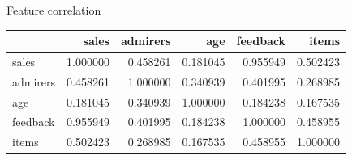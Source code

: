 \begin{frame}[fragile]{Feature correlation}
    \begin{center}
        \begin{tabular}{lrrrrr}
        \toprule
        {} &     sales &  admirers &       age &  feedback &     items \\
        \midrule
        sales    &  1.000000 &  0.458261 &  0.181045 &  0.955949 &  0.502423 \\
        admirers &  0.458261 &  1.000000 &  0.340939 &  0.401995 &  0.268985 \\
        age      &  0.181045 &  0.340939 &  1.000000 &  0.184238 &  0.167535 \\
        feedback &  0.955949 &  0.401995 &  0.184238 &  1.000000 &  0.458955 \\
        items    &  0.502423 &  0.268985 &  0.167535 &  0.458955 &  1.000000 \\
        \bottomrule
        \end{tabular}
    \end{center}
\end{frame}


